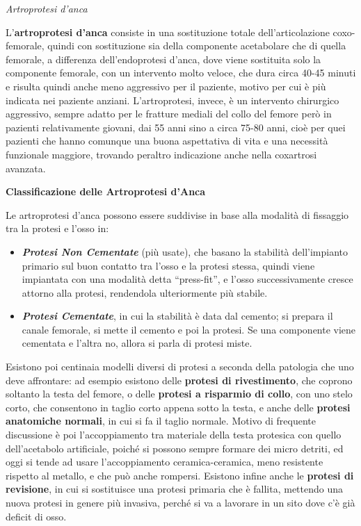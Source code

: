 \documentclass[]{article}
\begin{document}
\emph{Artroprotesi d'anca}

L'\textbf{artroprotesi d'anca} consiste in una sostituzione totale
dell'articolazione coxo-femorale, quindi con sostituzione sia della
componente acetabolare che di quella femorale, a differenza
dell'endoprotesi d'anca, dove viene sostituita solo la componente
femorale, con un intervento molto veloce, che dura circa 40-45 minuti e
risulta quindi anche meno aggressivo per il paziente, motivo per cui è
più indicata nei paziente anziani. L'artroprotesi, invece, è un
intervento chirurgico aggressivo, sempre adatto per le fratture mediali
del collo del femore però in pazienti relativamente giovani, dai 55 anni
sino a circa 75-80 anni, cioè per quei pazienti che hanno comunque una
buona aspettativa di vita e una necessità funzionale maggiore, trovando
peraltro indicazione anche nella coxartrosi avanzata.

\textbf{Classificazione delle Artroprotesi d'Anca}

Le artroprotesi d'anca possono essere suddivise in base alla modalità di
fissaggio tra la protesi e l'osso in:

\begin{itemize}
\item
  \textbf{\emph{Protesi Non Cementate}} (più usate), che basano la
  stabilità dell'impianto primario sul buon contatto tra l'osso e la
  protesi stessa, quindi viene impiantata con una modalità detta
  ``press-fit'', e l'osso successivamente cresce attorno alla protesi,
  rendendola ulteriormente più stabile.
\end{itemize}

\begin{itemize}
\item
  \textbf{\emph{Protesi Cementate}}, in cui la stabilità è data dal
  cemento; si prepara il canale femorale, si mette il cemento e poi la
  protesi. Se una componente viene cementata e l'altra no, allora si
  parla di protesi miste.
\end{itemize}

Esistono poi centinaia modelli diversi di protesi a seconda della
patologia che uno deve affrontare: ad esempio esistono delle
\textbf{protesi di rivestimento}, che coprono soltanto la testa del
femore, o delle \textbf{protesi a risparmio di collo}, con uno stelo
corto, che consentono in taglio corto appena sotto la testa, e anche
delle \textbf{protesi anatomiche normali}, in cui si fa il taglio
normale. Motivo di frequente discussione è poi l'accoppiamento tra
materiale della testa protesica con quello dell'acetabolo artificiale,
poiché si possono sempre formare dei micro detriti, ed oggi si tende ad
usare l'accoppiamento ceramica-ceramica, meno resistente rispetto al
metallo, e che può anche rompersi. Esistono infine anche le
\textbf{protesi di revisione}, in cui si sostituisce una protesi
primaria che è fallita, mettendo una nuova protesi in genere più
invasiva, perché si va a lavorare in un sito dove c'è già deficit di
osso.
\end{document}
